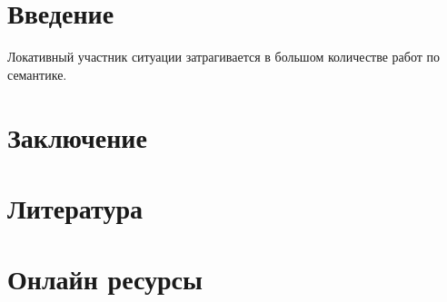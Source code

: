 
\usepackage{alltt}
\usepackage{bibunits}
\usepackage{enumitem}
\usepackage{ltablex,booktabs}


{
  \hypersetup{linkcolor=black}
  \tableofcontents
}
\pagebreak

\section{Введение} 
Локативный участник ситуации затрагивается в большом количестве работ по семантике. 
\citep{еврика}
\citep{падучева2004динамические}

\section{Заключение} \label{final}


\pagebreak
\section{Литература}
\renewcommand{\bibsection}{}
 

\section{Онлайн ресурсы}














